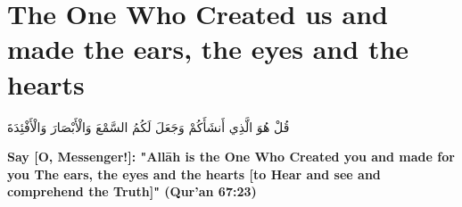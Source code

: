 \chapter{The One Who Created us and made the ears, the eyes and the hearts}
\begin{center}
    {\Huge    
        \begin{Arabic}
            قُلْ هُوَ الَّذِي أَنشَأَكُمْ وَجَعَلَ لَكُمُ السَّمْعَ وَالْأَبْصَارَ وَالْأَفْئِدَةَ
        \end{Arabic}
    }
\end{center}
\vspace*{\fill}
\vspace{3cm}
\begin{center}
    \large \textbf{Say [O, Messenger!]: "Allāh is the One Who Created you and made for you The ears, the eyes and the hearts [to Hear and see and comprehend the Truth]" (Qur'an 67:23)}
\end{center}
